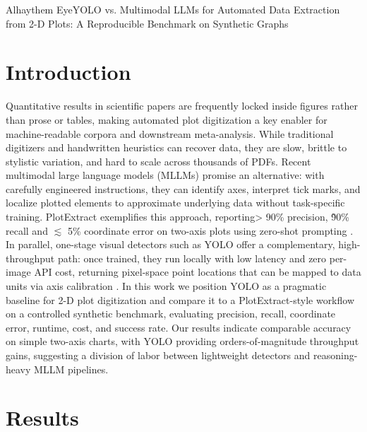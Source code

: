 \begin{teamsubmission}{Alhaythem Eye}{YOLO vs. Multimodal LLMs for Automated Data Extraction from 2-D Plots: A Reproducible Benchmark on Synthetic Graphs}
\section*{Introduction}

Quantitative results in scientific papers are frequently locked inside figures rather than prose or tables, making automated plot digitization a key enabler for machine-readable corpora and downstream meta-analysis. While traditional digitizers and handwritten heuristics can recover data, they are slow, brittle to stylistic variation, and hard to scale across thousands of PDFs. Recent multimodal large language models (MLLMs) promise an alternative: with carefully engineered instructions, they can identify axes, interpret tick marks, and localize plotted elements to approximate underlying data without task-specific training. PlotExtract exemplifies this approach, reporting> 90\% precision, \~90\% recall and $\lesssim$ 5\% coordinate error on two-axis plots using zero-shot prompting \cite{polak2025plotextract}. In parallel, one-stage visual detectors such as YOLO offer a complementary, high-throughput path: once trained, they run locally with low latency and zero per-image API cost, returning pixel-space point locations that can be mapped to data units via axis calibration \cite{redmon2016yolo,bochkovskiy2020yolov4}. In this work we position YOLO as a pragmatic baseline for 2-D plot digitization and compare it to a PlotExtract-style workflow on a controlled synthetic benchmark, evaluating precision, recall, coordinate error, runtime, cost, and success rate. Our results indicate comparable accuracy on simple two-axis charts, with YOLO providing orders-of-magnitude throughput gains, suggesting a division of labor between lightweight detectors and reasoning-heavy MLLM pipelines.

\section*{Results}


\end{teamsubmission}
